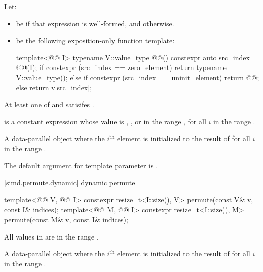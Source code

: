 \begin{itemdescr}
\pnum
Let:
\begin{itemize}
\item
{} be 
if that expression is well-formed, and  otherwise.
\item
{} be the following exposition-only function template:
\begin{codeblock}
template<@@ I>
typename V::value_type @@() {
  constexpr auto src_index = @@(I);
  if constexpr (src_index == zero_element) {
    return typename V::value_type();
  } else if constexpr (src_index == uninit_element) {
    return @@;
  } else {
    return v[src_index];
  }
}
\end{codeblock}
\end{itemize}

\pnum
\constraints
At least one of
and
satisifes .

\pnum
\mandates
{} is a constant expression whose value is
, , or in the range
, for all $i$ in the range .

\pnum
\returns
A data-parallel object where the
$i^\text{th}$ element is initialized to the result of
 for all $i$ in the range .

\pnum
\remarks
The default argument for template parameter  is .
\end{itemdescr}

[simd.permute.dynamic]{ dynamic permute}

\begin{itemdecl}
template<@@ V, @@ I>
  constexpr resize_t<I::size(), V> permute(const V& v, const I& indices);
template<@@ M, @@ I>
  constexpr resize_t<I::size(), M> permute(const M& v, const I& indices);
\end{itemdecl}

\begin{itemdescr}
\pnum
\expects
All values in  are in the range .

\pnum
\returns
A data-parallel object where the $i^\text{th}$
element is initialized to the result of  for all $i$ in
the range .
\end{itemdescr}

